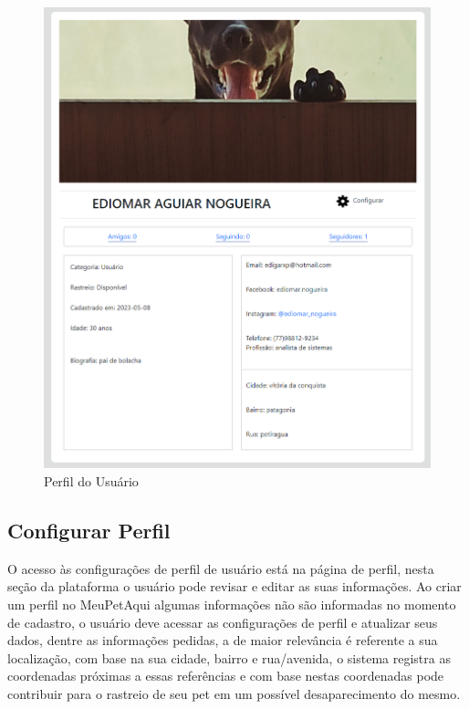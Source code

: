 \begin{figure}[htb]
     \centering
     \includegraphics[width=14cm]{arquivos/Figuras/image12.png}
     \caption{Perfil do Usuário}
     \label{fig:PerfilDoUsuário}
\end{figure}

\newpage
\subsection{Configurar Perfil}
O acesso às configurações de perfil de usuário está na página de perfil, nesta seção da plataforma o usuário pode revisar e editar as suas informações. Ao criar um perfil no MeuPetAqui algumas informações não são informadas no momento de cadastro, o usuário deve acessar as configurações de perfil e atualizar seus dados, dentre as informações pedidas, a de maior relevância é referente a sua localização, com base na sua cidade, bairro e rua/avenida, o sistema registra as coordenadas próximas a essas referências e com base nestas coordenadas pode contribuir para o rastreio de seu pet em um possível desaparecimento do mesmo. 

